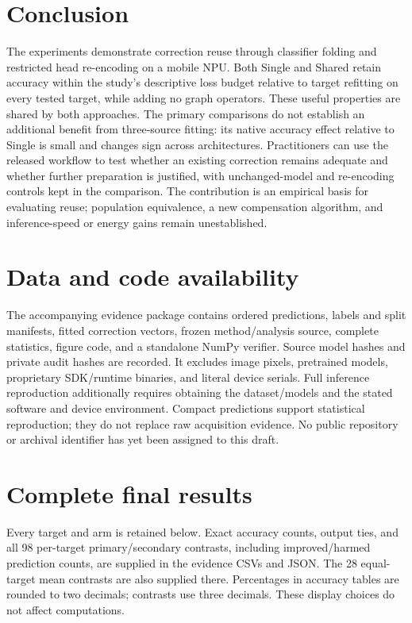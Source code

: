 \documentclass[10pt,twocolumn]{article}
\begin{document}
\section{Conclusion}
The experiments demonstrate correction reuse through classifier folding and restricted head re-encoding on a mobile NPU. Both Single and Shared retain accuracy within the study's descriptive loss budget relative to target refitting on every tested target, while adding no graph operators. These useful properties are shared by both approaches. The primary comparisons do not establish an additional benefit from three-source fitting: its native accuracy effect relative to Single is small and changes sign across architectures. Practitioners can use the released workflow to test whether an existing correction remains adequate and whether further preparation is justified, with unchanged-model and re-encoding controls kept in the comparison. The contribution is an empirical basis for evaluating reuse; population equivalence, a new compensation algorithm, and inference-speed or energy gains remain unestablished.

\section*{Data and code availability}
The accompanying evidence package contains ordered predictions, labels and split manifests, fitted correction vectors, frozen method/analysis source, complete statistics, figure code, and a standalone NumPy verifier. Source model hashes and private audit hashes are recorded. It excludes image pixels, pretrained models, proprietary SDK/runtime binaries, and literal device serials. Full inference reproduction additionally requires obtaining the dataset/models and the stated software and device environment. Compact predictions support statistical reproduction; they do not replace raw acquisition evidence. No public repository or archival identifier has yet been assigned to this draft.

\begingroup\setlength{\bibsep}{2pt}


\endgroup

\onecolumn
\appendix
\section{Complete final results}\label{app:results}
Every target and arm is retained below. Exact accuracy counts, output ties, and all 98 per-target primary/secondary contrasts, including improved/harmed prediction counts, are supplied in the evidence CSVs and JSON. The 28 equal-target mean contrasts are also supplied there. Percentages in accuracy tables are rounded to two decimals; contrasts use three decimals. These display choices do not affect computations.
\end{document}
